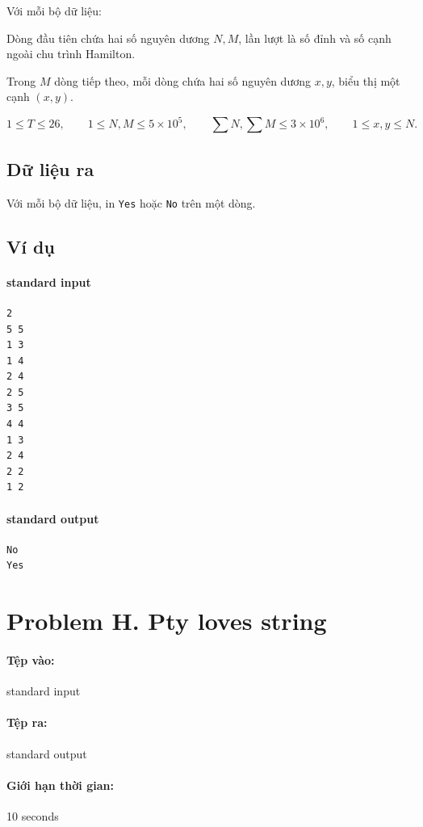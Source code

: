 \documentclass[11pt]{article}
\begin{document}
Với mỗi bộ dữ liệu:

Dòng đầu tiên chứa hai số nguyên dương \(N,M\), lần lượt là số đỉnh và số
cạnh ngoài chu trình Hamilton.

Trong \(M\) dòng tiếp theo, mỗi dòng chứa hai số nguyên dương \(x,y\), biểu
thị một cạnh \((x,y)\).

\[
  1\le T\le 26,\qquad
  1\le N,M\le 5\times 10^5,\qquad
  \sum N,\sum M\le 3\times 10^6,\qquad
  1\le x,y\le N.
\]

\subsection*{Dữ liệu ra}

Với mỗi bộ dữ liệu, in \texttt{Yes} hoặc \texttt{No} trên một dòng.

\subsection*{Ví dụ}

\paragraph{standard input}
\begin{verbatim}
2
5 5
1 3
1 4
2 4
2 5
3 5
4 4
1 3
2 4
2 2
1 2
\end{verbatim}

\paragraph{standard output}
\begin{verbatim}
No
Yes
\end{verbatim}

\section{Problem H. Pty loves string}

\paragraph{Tệp vào:} standard input
\paragraph{Tệp ra:} standard output
\paragraph{Giới hạn thời gian:} 10 seconds
\end{document}
